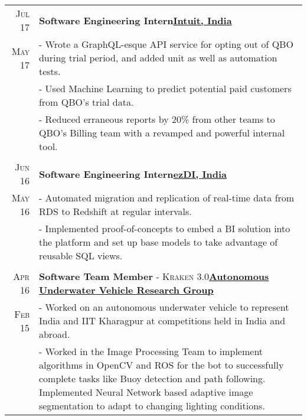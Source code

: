 \documentclass[a4paper,11pt]{extarticle} %
\begin{document}
\begin{tabular}{r|p{18cm}}

\textsc{Jul 17} & \textbf{Software Engineering Intern}\hfill\textbf{\href{https://www.intuit.com/}{Intuit, India}}\\
\textsc{May 17}& \footnotesize{- Wrote a GraphQL-esque API service for opting out of QBO during trial period, and added unit as well as automation tests.}\\
& \footnotesize{- Used Machine Learning to predict potential paid customers from QBO's trial data.}\\
& \footnotesize{- Reduced erraneous reports by 20\% from other teams to QBO's Billing team with a revamped and powerful internal tool.}\\
\multicolumn{2}{c}{} \\

\textsc{Jun 16} & \textbf{Software Engineering Intern}\hfill\textbf{\href{http://www.ezdi.com/}{ezDI, India}}\\
\textsc{May 16}& \footnotesize{- Automated migration and replication of real-time data from RDS to Redshift at regular intervals.}\\
& \footnotesize{- Implemented proof-of-concepts to embed a BI solution into the platform and set up base models to take advantage of reusable SQL views.}\\
\multicolumn{2}{c}{} \\

\textsc{Apr 16} & \textbf{Software Team Member} \textsc{- Kraken 3.0}\hfill\textbf{\href{http://auv-iitkgp.in/}{Autonomous Underwater Vehicle Research Group}}\\
\textsc{Feb 15} & \footnotesize{- Worked on an autonomous underwater vehicle to represent India and IIT Kharagpur at competitions held in India and abroad.}\\
& \footnotesize{- Worked in the Image Processing Team to implement algorithms in OpenCV and ROS for the bot to successfully complete tasks like Buoy detection and path following. Implemented Neural Network based adaptive image segmentation to adapt to changing lighting conditions.}
\end{tabular}
\end{document}
